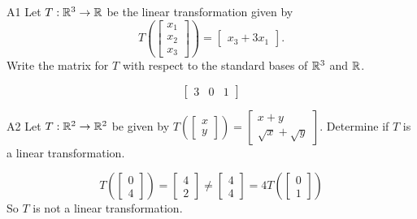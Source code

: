 \documentclass{sbgLAsemi}
\begin{document}
\begin{problem}{A1}
Let $T: \mathbb{R}^3 \rightarrow \mathbb{R}$ be the linear transformation given by $$T\left(\begin{bmatrix} x_1 \\ x_2 \\ x_3  \end{bmatrix} \right) = \begin{bmatrix} x_3+3x_1 \end{bmatrix}.$$ Write the matrix for $T$ with respect to the standard bases of $\mathbb{R}^3$ and $\mathbb{R}$.
\end{problem}
\begin{solution}
$$\begin{bmatrix} 3 & 0 & 1 \end{bmatrix}$$
\end{solution}
\begin{problem}{A2} 
Let $T: \mathbb{R}^2 \rightarrow \mathbb{R}^2$ be given by $T\left(\begin{bmatrix}x \\ y  \end{bmatrix} \right) = \begin{bmatrix} x+y \\ \sqrt{x}+\sqrt{y} \end{bmatrix}$.  Determine if $T$ is a linear transformation.
\end{problem}
\begin{solution}
$$T\left(\begin{bmatrix} 0 \\ 4 \end{bmatrix}\right) = \begin{bmatrix} 4 \\ 2 \end{bmatrix} \neq \begin{bmatrix} 4 \\ 4 \end{bmatrix} = 4T\left(\begin{bmatrix} 0 \\ 1 \end{bmatrix} \right)$$
So $T$ is not a linear transformation.
\end{solution}
\end{document}
